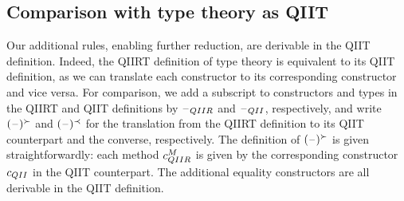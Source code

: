 \documentclass[a4paper,UKenglish,numberwithinsect,cleveref,thm-restate]{lipics-v2021}
\begin{document}
%

\subsection{Comparison with type theory as QIIT} \label{subsec:equivalence}
Our additional rules, enabling further reduction, are derivable in the QIIT definition.
Indeed, the QIIRT definition of type theory is equivalent to its QIIT definition, as we can translate each constructor to its corresponding constructor and vice versa.
For comparison, we add a subscript to constructors and types in the QIIRT and QIIT definitions by $\blank_\IR$ and $\blank_\I$, respectively, and write $(\mathord{\hspace{1pt}\text{--}\hspace{1pt}})^{\succ}$ and $(\mathord{\hspace{1pt}\text{--}\hspace{1pt}})^{\prec}$ for the translation from the QIIRT definition to its QIIT counterpart and the converse, respectively.
%
The definition of $(\mathord{\hspace{1pt}\text{--}\hspace{1pt}})^{\succ}$ is given straightforwardly: each method $c^M_{\IR}$ is given by the corresponding constructor $c_{\I}$ in the QIIT counterpart.
The additional equality constructors are all derivable in the QIIT definition. 
\end{document}
